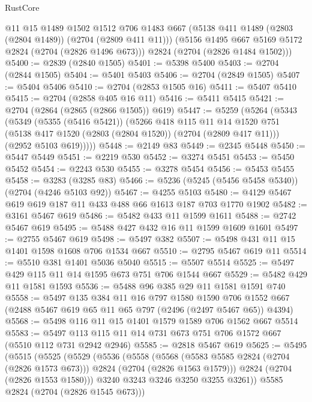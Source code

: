 \begin{lexlean}{RustCore}
\begin{coremodule}
      @11
      @15
      @1489
      @1502
      @1512
      @706
      @1483
      @667
      (@5138 @411 @1489 (@2803 (@2804 @1489)) (@2704 (@2809 @411 @11)))
      (@5156 @1495 @667 @5169 @5172 @2824 (@2704 (@2826 @1496 @673)))
      @2824
      (@2704 (@2826 @1484 @1502)))
@5400 := @2839 (@2840 @1505)
@5401 := @5398 @5400
@5403 := @2704 (@2844 @1505)
@5404 := @5401 @5403
@5406 := @2704 (@2849 @1505)
@5407 := @5404 @5406
@5410 := @2704 (@2853 @1505 @16)
@5411 := @5407 @5410
@5415 := @2704 (@2858 @405 @16 @11)
@5416 := @5411 @5415
@5421 := @2704 (@2864 (@2865 (@2866 @1505)) @619)
@5447 := @5259
    (@5264
      (@5343
        (@5349
          (@5355 (@5416 @5421))
          (@5266
            @418
            @115
            @11
            @14
            @1520
            @751
            (@5138 @417 @1520 (@2803 (@2804 @1520)) (@2704 (@2809 @417 @11)))
            (@2952 @5103 @619)))))
@5448 := @2149 @83
@5449 := @2345 @5448
@5450 := @5447 @5449
@5451 := @2219 @530
@5452 := @3274 @5451
@5453 := @5450 @5452
@5454 := @2243 @530
@5455 := @3278 @5454
@5456 := @5453 @5455
@5458 := @3283 (@3285 @83)
@5466 := @5236 (@5245 (@5456 @5458 @5340)) (@2704 (@4246 @5103 @92))
@5467 := @4255 @5103
@5480 := @4129 @5467 @619 @619 @187 @11 @433 @488 @66 @1613 @187 @703 @1770 @1902
@5482 := @3161 @5467 @619
@5486 := @5482 @433 @11 @1599 @1611
@5488 := @2742 @5467 @619
@5495 := @5488 @427 @432 @16 @11 @1599 @1609 @1601
@5497 := @2755 @5467 @619
@5498 := @5497 @382
@5507 := @5498 @431 @11 @15 @1401 @1598 @1608 @706 @1534 @667
@5510 := @2795 @5467 @619 @11
@5514 := @5510 @381 @1401 @5036 @5040
@5515 := @5507 @5514
@5525 := @5497 @429 @115 @11 @14 @1595 @673 @751 @706 @1544 @667
@5529 := @5482 @429 @11 @1581 @1593
@5536 := @5488 @96 @385 @29 @11 @1581 @1591 @740
@5558 := @5497
    @135
    @384
    @11
    @16
    @797
    @1580
    @1590
    @706
    @1552
    @667
    (@2488 @5467 @619 @65 @11 @65 @797 (@2496 (@2497 @5467 @65)) @4394)
@5568 := @5498 @116 @11 @15 @1401 @1579 @1589 @706 @1562 @667 @5514
@5583 := @5497 @113 @115 @11 @14 @731 @673 @751 @706 @1572 @667 (@5510 @112 @731 @2942 @2946)
@5585 := @2818 @5467 @619
@5625 := @5495
    (@5515
      (@5525
        (@5529
          (@5536
            (@5558
              (@5568
                (@5583 @5585 @2824 (@2704 (@2826 @1573 @673)))
                @2824
                (@2704 (@2826 @1563 @1579)))
              @2824
              (@2704 (@2826 @1553 @1580)))
            @3240
            @3243
            @3246
            @3250
            @3255
            @3261))
        @5585
        @2824
        (@2704 (@2826 @1545 @673)))

\end{coremodule}
\end{lexlean}
